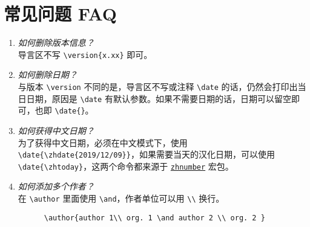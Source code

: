 \documentclass[cn,hazy,blue,14pt,screen]{elegantnote}
\begin{document}
\section{常见问题 FAQ}

\begin{enumerate}[label=\arabic*).]
    \item \textit{如何删除版本信息？}\\
          导言区不写 \lstinline|\version{x.xx}| 即可。
    \item \textit{如何删除日期？}\\
          与版本 \lstinline{\version} 不同的是，导言区不写或注释 \lstinline{\date} 的话，仍然会打印出当日日期，原因是 \lstinline{\date} 有默认参数。如果不需要日期的话，日期可以留空即可，也即 \lstinline|\date{}|。
    \item \textit{如何获得中文日期？}\\
          为了获得中文日期，必须在中文模式下，使用 \lstinline|\date{\zhdate{2019/12/09}}|，如果需要当天的汉化日期，可以使用 \lstinline|\date{\zhtoday}|，这两个命令都来源于 \href{https://ctan.org/pkg/zhnumber}{\lstinline{zhnumber}} 宏包。
    \item \textit{如何添加多个作者？}\\
          在 \lstinline{\author} 里面使用 \lstinline{\and}，作者单位可以用 \lstinline{\\} 换行。
          \begin{lstlisting}
      \author{author 1\\ org. 1 \and author 2 \\ org. 2 }
    \end{lstlisting}
\end{enumerate}
\end{document}
